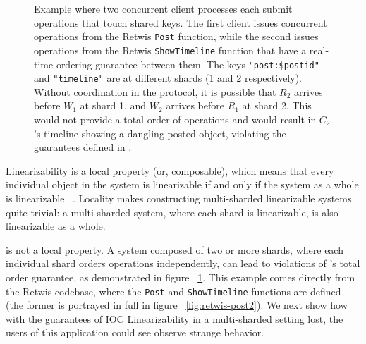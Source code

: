 \begin{figure}[!tb]
    \caption{Example where two concurrent client processes each submit operations that touch shared keys. The first client issues concurrent operations from the Retwis \texttt{Post} function, while the second issues operations from the Retwis \texttt{ShowTimeline} function that have a real-time ordering guarantee between them. The keys \texttt{"post:\$postid"} and \texttt{"timeline"} are at different shards (1 and 2 respectively). Without coordination in the protocol, it is possible that $R_2$ arrives before $W_1$ at shard 1, and $W_2$ arrives before $R_1$ at shard 2. This would not provide a total order of operations and would result in $C_2$'s timeline showing a dangling posted object, violating the guarantees defined in \mdl{}.}
    \label{fig:concurrentbatches}
\end{figure}

Linearizability is a local property (or, composable), which means that every individual object in the system is linearizable if and only if the system as a whole is linearizable ~\cite{herlihy1990linearizability}. Locality makes constructing multi-sharded linearizable systems quite trivial: a multi-sharded system, where each shard is linearizable, is also linearizable as a whole.

\mdl{} is not a local property. 
A system composed of two or more shards, where each individual \iocll{} shard orders operations independently, can lead to violations of \MDL{}'s total order guarantee, as demonstrated in figure ~\ref{fig:concurrentbatches}. 
This example comes directly from the Retwis codebase, where the \texttt{Post} and \texttt{ShowTimeline} functions are defined (the former is portrayed in full in figure ~\ref{fig:retwis-post2}). We next show how with the guarantees of IOC
Linearizability in a multi-sharded setting lost, the users of this application could see observe strange behavior.

